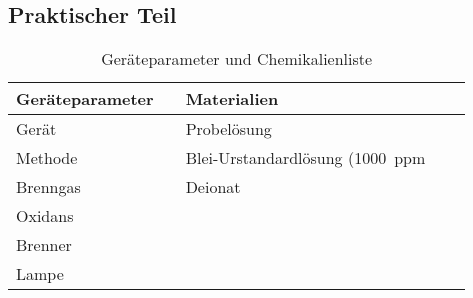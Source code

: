 \subsection{Praktischer Teil}
  
  \begin{table}[H]
    \centering
    \caption[Geräteparameter und Chemikalienliste, Quelle: Autor]{Geräteparameter und Chemikalienliste}
    
    \label{tab:GerateparameterFES}
    \begin{tabular}{@{}ll|lp{4.5cm}l@{}}
      \toprule
      Geräteparameter & & Materialien   \\ \midrule
        Gerät &  & Probelösung  \\ 
        Methode &  & Blei-Urstandardlösung (\SI[mode=text]{1000}{ppm} \\
        Brenngas &  & Deionat \\
        Oxidans &  &  \\
        Brenner &  &  \\
        Lampe &  &  \\ \bottomrule
    \end{tabular}
  \end{table}